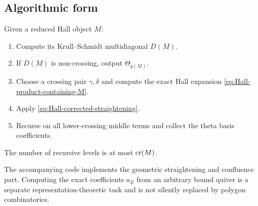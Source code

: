 \subsection{Algorithmic form}

\begin{algorithm}
\label{alg:Hall-to-theta}
Given a reduced Hall object $M$:
\begin{enumerate}[label=\arabic*.,leftmargin=2.3em]
\item Compute its Krull--Schmidt multidiagonal $D(M)$.
\item If $D(M)$ is non-crossing, output $\Theta_{g(M)}$.
\item Choose a crossing pair $\gamma,\delta$ and compute the exact Hall
      expansion \eqref{eq:Hall-product-containing-M}.
\item Apply \eqref{eq:Hall-corrected-straightening}.
\item Recurse on all lower-crossing middle terms and collect the theta basis
      coefficients.
\end{enumerate}
The number of recursive levels is at most $\operatorname{cr}(M)$.
\end{algorithm}

The accompanying code implements the geometric straightening and confluence
part.  Computing the exact coefficients $a_E$ from an arbitrary bound quiver
is a separate representation-theoretic task and is not silently replaced by
polygon combinatorics.

